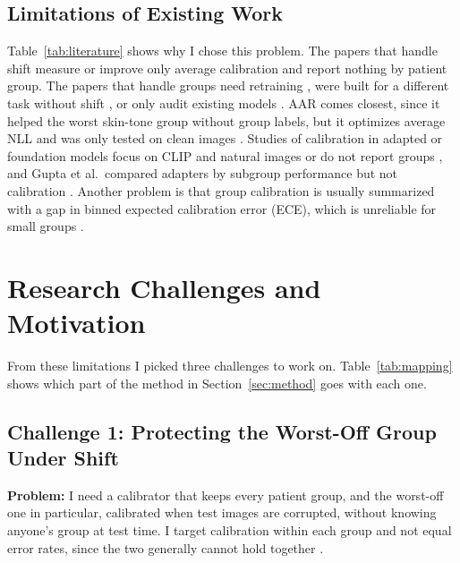 \documentclass[sigconf,nonacm]{acmart}
\begin{document}
\subsection{Limitations of Existing Work}

Table~\ref{tab:literature} shows why I chose this problem. The papers that handle shift \cite{ovadia2019trust,tomani2021posthoc,tomani2023dac,roschewitz2025where,hekler2023tta} measure or improve only average calibration and report nothing by patient group. The papers that handle groups need retraining \cite{shui2023clusterfocal}, were built for a different task without shift \cite{salvador2022faircal}, or only audit existing models \cite{dominique2025calibration}. AAR comes closest, since it helped the worst skin-tone group without group labels, but it optimizes average NLL and was only tested on clean images \cite{yuksekgonul2023atypicality}. Studies of calibration in adapted or foundation models focus on CLIP and natural images \cite{tu2024empirical,oh2024calibrated,murugesan2024robust} or do not report groups \cite{hekler2025beyond,huang2026uncertainty,lin2026crsbench}, and Gupta et al.\ compared adapters by subgroup performance but not calibration \cite{gupta2026subgroup}. Another problem is that group calibration is usually summarized with a gap in binned expected calibration error (ECE), which is unreliable for small groups \cite{kumar2019verified,riccilara2023calibration}.

\section{Research Challenges and Motivation}
\label{sec:challenges}

From these limitations I picked three challenges to work on. Table~\ref{tab:mapping} shows which part of the method in Section~\ref{sec:method} goes with each one.

\subsection{Challenge 1: Protecting the Worst-Off Group Under Shift}
\label{sec:ch1}

\textbf{Problem:} I need a calibrator that keeps every patient group, and the worst-off one in particular, calibrated when test images are corrupted, without knowing anyone's group at test time. I target calibration within each group and not equal error rates, since the two generally cannot hold together \cite{pleiss2017fairness}.
\end{document}
